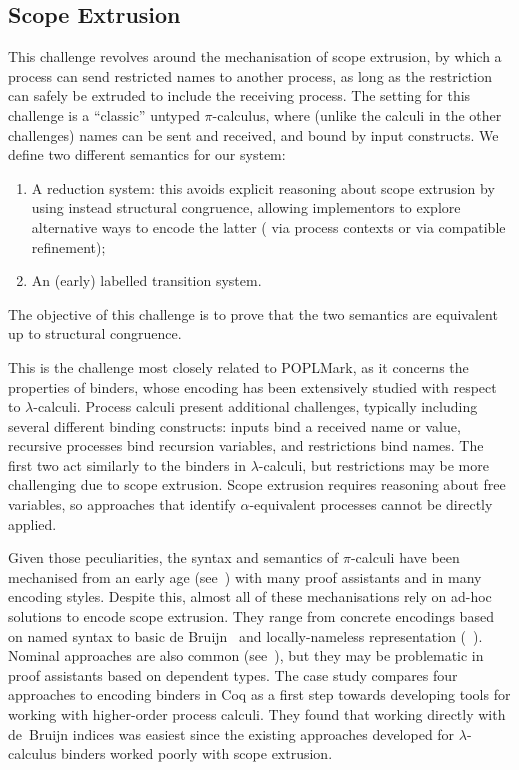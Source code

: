 \documentclass[runningheads]{llncs}
\begin{document}
\subsection{Scope Extrusion}
This challenge revolves around the mechanisation of scope
extrusion, by which a process can send restricted names to another
process, as long as the restriction can safely be extruded to include
the receiving process.  The setting for this challenge is a
``classic'' untyped \( \pi \)-calculus, where (unlike the calculi in
the other challenges) names can be sent and received, and bound by
input constructs.  We define two different semantics for our system:
\begin{enumerate}
\item A reduction system: this avoids explicit reasoning about scope
  extrusion by using instead structural congruence, allowing
  implementors to explore alternative ways to encode the latter (\eg
  via process contexts or via compatible refinement);
\item An (early) labelled transition system.
\end{enumerate}
The objective of this
challenge is to prove that the two semantics are equivalent up to
structural congruence.

This is the challenge most closely related to POPLMark,
as it concerns the properties of binders, whose encoding has been
extensively studied with respect to $\lambda$-calculi. Process calculi
present additional challenges, typically including several
different binding constructs: inputs bind a received name or value,
recursive processes bind recursion variables, and restrictions bind
names. The first two act similarly to the binders in
$\lambda$-calculi, but restrictions may be more challenging due to
scope extrusion.
Scope extrusion requires reasoning about free variables, so approaches that identify \(\alpha\)-equivalent processes cannot be directly applied.

Given those peculiarities, the syntax and semantics of $\pi$-calculi have been 
mechanised from an early age (see~\cite{Melham1994}) with many proof
assistants and in many encoding styles.
Despite this, almost all of these mechanisations rely on ad-hoc solutions to encode scope extrusion.
They range from concrete encodings based on named syntax
\cite{Melham1994} to basic de Bruijn~\cite{Hirschkoff1997, Perera2018} and locally-nameless
representation (\eg~\cite{Castro2020}).
Nominal approaches are also common (see~\cite{Bengtson2009}), but they
may be problematic in proof assistants based on dependent types.
The case study \cite{AmbalLS21} compares four approaches to encoding
binders in Coq as a first step towards developing tools for working
with higher-order process calculi.  They found that working directly
with de~Bruijn indices was easiest since the existing
approaches developed for $\lambda$-calculus binders worked poorly 
with scope extrusion.
\end{document}
